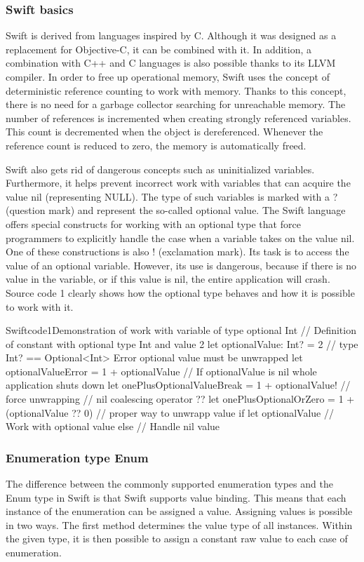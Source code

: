 \documentclass[
  language=english,
  figures=false,
  sourcecodes,
  index
]{kidiplom}
\begin{document}
\subsubsection{Swift basics}
Swift is derived from languages inspired by C. Although it was designed as a replacement for Objective-C, it can be combined with it. In addition, a combination with C++ and C languages is also possible thanks to its LLVM compiler. In order to free up operational memory, Swift uses the concept of deterministic reference counting to work with memory. Thanks to this concept, there is no need for a garbage collector searching for unreachable memory. The number of references is incremented when creating strongly referenced variables. This count is decremented when the object is dereferenced. Whenever the reference count is reduced to zero, the memory is automatically freed.

Swift also gets rid of dangerous concepts such as uninitialized variables. Furthermore, it helps prevent incorrect work with variables that can acquire the value nil (representing NULL). The type of such variables is marked with a ? (question mark) and represent the so-called optional value. The Swift language offers special constructs for working with an optional type that force programmers to explicitly handle the case when a variable takes on the value nil. One of these constructions is also ! (exclamation mark). Its task is to access the value of an optional variable. However, its use is dangerous, because if there is no value in the variable, or if this value is nil, the entire application will crash. Source code 1 clearly shows how the optional type behaves and how it is possible to work with it.

\begin{kicode}{Swift}{code1}{Demonstration of work with variable of type optional Int}
// Definition of constant with optional type Int and value 2
let optionalValue: Int? = 2 // type Int? == Optional<Int>
Error optional value must be unwrapped
let optionalValueError = 1 + optionalValue
// If optionalValue is nil whole application shuts down
let onePlusOptionalValueBreak = 1 + optionalValue! // force unwrapping
// nil coalescing operator ??
let onePlusOptionalOrZero = 1 + (optionalValue ?? 0)
// proper way to unwrapp value
if let optionalValue {
// Work with optional value
} else {
// Handle nil value
}
\end{kicode}

\subsubsection{Enumeration type Enum}
The difference between the commonly supported enumeration types and the Enum type in Swift is that Swift supports value binding. This means that each instance of the enumeration can be assigned a value. Assigning values is possible in two ways. The first method determines the value type of all instances. Within the given type, it is then possible to assign a constant raw value to each case of enumeration.
\end{document}
